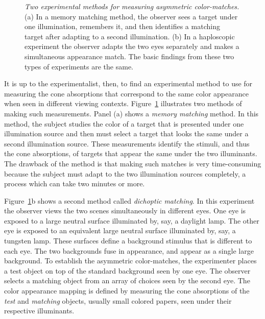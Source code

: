 \begin{figure}
\centerline{
}
\caption[Asymmetric Color-matching methods]{
{\em Two experimental methods for measuring asymmetric color-matches.}
(a)  In a memory matching method, the observer sees a target under
one illumination, remembers it, and then identifies 
a matching target after adapting to a second illumination.
(b)  In a haploscopic experiment the observer adapts 
the two eyes separately and makes a simultaneous appearance match.
The basic findings from these two types of experiments are the same.
}
\label{f8:matchingMethods}
\end{figure}
It is up to the experimentalist, then, to find an experimental method
to use for measuring the cone absorptions that correspond to the same
color appearance when seen in different viewing contexts.
Figure~\ref{f8:matchingMethods} illustrates two methods of making
such measurements.  Panel (a) shows a {\em memory matching} method.  In
this method, the subject studies the color of a target that is
presented under one illumination source and then must select a target
that looks the same under a second illumination source.  These
measurements identify the stimuli, and thus the cone absorptions, of
targets that appear the same under the two illuminants.  The drawback
of the method is that making such matches is very time-consuming
because the subject must adapt to the two illumination sources
completely, a process which can take two minutes or more.

Figure~\ref{f8:matchingMethods}b shows a second method called {\em
dichoptic matching}.  In this experiment the observer views the two
scenes simultaneously in different eyes.  One eye is exposed to a
large neutral surface illuminated by, say, a daylight lamp.  The other
eye is exposed to an equivalent large neutral surface illuminated by,
say, a tungsten lamp.  These surfaces define a background stimulus
that is different to each eye.  The two backgrounds fuse in
appearance, and appear as a single large background.  To establish the
asymmetric color-matches, the experimenter places a test object on top
of the standard background seen by one eye.  The observer selects a
matching object from an array of choices seen by the second eye.  The
color appearance mapping is defined by measuring the cone absorptions
of the {\em test} and {\em matching} objects, usually small colored
papers, seen under their respective illuminants.

